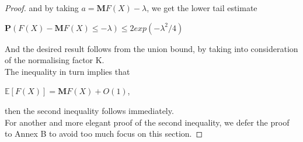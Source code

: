 \documentclass{article}
\begin{document}
\begin{proof}
    and by taking $a = \mathbf{M}F(X) - \lambda$, we get the lower tail estimate
    \begin{center}
        $\mathbf{P}(F(X) - \mathbf{M}F(X) \leq -\lambda) \leq 2exp(-\lambda^2/4)$
    \end{center}
    And the desired result follows from the union bound, by taking into consideration of the normalising factor K.\\
    The inequality in turn implies that
    \begin{center}
        $\mathbb{E}[F(X)] = \mathbf{M}F(X) + O(1)$,
    \end{center}
    then the second inequality follows immediately.\\
    For another and more elegant proof of the second inequality, we defer the proof to Annex B to avoid too much focus on this section.
\end{proof}
\end{document}
